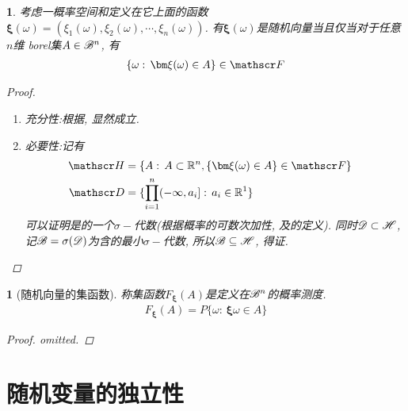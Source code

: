 

\newtheorem{probability_distribution_of_random_vector}[theorem_root]{\lemma}
\begin{probability_distribution_of_random_vector}
考虑一概率空间\prbsp 和定义在它上面的函数\(\bm\xi(\omega) = (\xi_1(\omega), \xi_2(\omega), \cdots, \xi_n(\omega))\).
有\(\bm\xi(\omega)\)是随机向量当且仅当对于任意\(n\)维 borel集\(A\in\msB^n\), 有
\begin{align}
    \{\omega:\,\bm\xi(\omega)\in A\}\in\msF
\end{align}
\begin{proof}
\ \par
\begin{enumerate}
\item 充分性:\quad 根据, 显然成立.
\item 必要性:\quad 记有
\begin{align}
    {\sgmp} &= \{A:\, A\subset\Rs^n, \{\bm\xi(\omega)\in A\}\in\sgmo\}\cr
    {\algr} &= \{\prod\limits_{i=1}^{n}(-\infty, a_i]:\,a_i\in\Rs^1\}
\end{align}
可以证明\sgmp 是\mO 的一个\(\sigma-\)代数(根据概率的可数次加性, 及\sgmp 的定义).
同时\(\algr\subset\sgmp\), 记\(\sgmb = \sigma(\algr)\)为含\algr 的最小\(\sigma-\)代数, 
所以\(\sgmb\subseteq\sgmp\), 得证.
\end{enumerate}
\end{proof}
\end{probability_distribution_of_random_vector}

\newtheorem{set_function_of_random_vector}[theorem_root]{\theorem}
\begin{set_function_of_random_vector}[随机向量的集函数]
    称集函数\(F_{\bm\xi}(A)\)是定义在\(\sgmb^n\)的概率测度.
    \begin{align}
        F_{\bm\xi}(A) = P\{\omega:\,\bm\xi{\omega}\in A\}
    \end{align}
\begin{proof} omitted.\end{proof}
\end{set_function_of_random_vector}


\section{随机变量的独立性}

